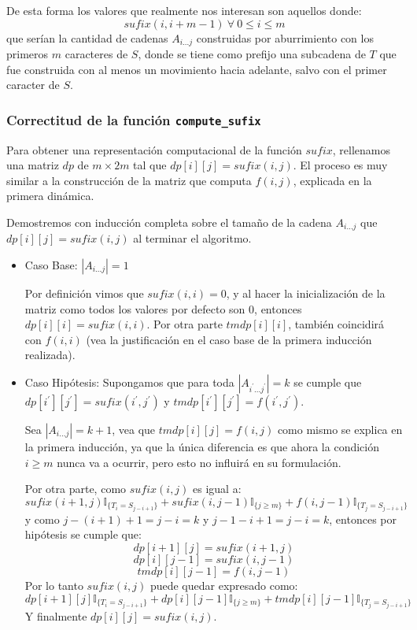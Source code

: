 \documentclass[a4paper]{article}
\begin{document}
    De esta forma los valores que realmente nos interesan son aquellos donde:
    $$sufix(i, i+m-1) ~ \forall~0 \leq i \leq m$$
    que serían la cantidad de cadenas $A_{i...j}$ construidas por aburrimiento con los primeros $m$ caracteres de $S$, donde se tiene como prefijo una subcadena de $T$ que fue construida con al menos un movimiento hacia adelante, salvo con el primer caracter de $S$.

    \subsubsection*{Correctitud de la funci\'on \texttt{compute\_sufix}}

    Para obtener una representaci\'on computacional de la funci\'on $sufix$,
    rellenamos una matriz $dp$ de $m \times 2m$ tal que $dp[i][j] = sufix(i,j)$. El proceso es muy similar a la construcción de la matriz que computa $f(i,j)$, explicada en la primera dinámica.
    
    Demostremos con inducción completa sobre el tamaño de la cadena $A_{i...j}$ que $dp[i][j]=sufix(i,j)$ al terminar el algoritmo.
    
    \begin{itemize}
    	\item Caso Base: $|A_{i...j}| = 1$
    	
    	Por definición vimos que $sufix(i,i) = 0$, y al hacer la inicialización de la matriz como todos los valores por defecto son $0$, entonces $dp[i][i] = sufix(i,i)$.
    	Por otra parte $tmdp[i][i]$, también coincidirá con $f(i,i)$ (vea la justificación en el caso base de la primera inducción realizada).
    	
    	\item Caso Hipótesis:
    	Supongamos que para toda $|A_{i^\prime...j^\prime}| = k$ se cumple que $dp[i^\prime][j^\prime] = sufix(i^\prime, j^\prime)$ y $tmdp[i^\prime][j^\prime] = f(i^\prime, j^\prime)$.
    	
    	Sea $|A_{i...j}| = k + 1$, vea que $tmdp[i][j] = f(i,j)$ como mismo se explica en la primera inducción, ya que la única diferencia es que ahora la condición $i \ge m$ nunca va a ocurrir, pero esto no influirá en su formulación.
    	
    	Por otra parte, como $sufix(i,j)$ es igual a:
    	$$ sufix(i+1,j)\mathbb{I}_{ \{ T_i = S_{j-i+1} \}} + 
    	sufix(i, j-1) \mathbb{I}_{ \{ j \ge m \}} + 
    	f(i, j-1) \mathbb{I}_{ \{ T_j = S_{j-i+1}\}} $$
    	y como $j-(i+1)+1 = j-i = k$ y $j-1 - i + 1 = j-i=k$, entonces por hipótesis se cumple que:
    	$$ dp[i+1][j] = sufix(i+1,j) $$
    	$$ dp[i][j-1] = sufix(i,j-1) $$
    	$$ tmdp[i][j-1] = f(i,j-1) $$
    	Por lo tanto $sufix(i,j)$ puede quedar expresado como:
    	$$ dp[i+1][j]\mathbb{I}_{ \{ T_i = S_{j-i+1} \}} + 
    	dp[i][j-1] \mathbb{I}_{ \{ j \ge m \}} + 
    	tmdp[i][j-1] \mathbb{I}_{ \{ T_j = S_{j-i+1}\}} $$
    	Y finalmente $dp[i][j] = sufix(i,j)$.    	
    \end{itemize}
	
\end{document}
